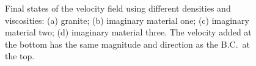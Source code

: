 \documentclass[12pt]{article}
\numberwithin{figure}{section}  %
\numberwithin{equation}{section}  %
\begin{document}
\begin{multicols}{2}
\begin{figure}[!htb]
	\centering
	\caption{Final states of the velocity field using different densities and viscosities: (a) granite; (b) imaginary material one; (c) imaginary material two; (d) imaginary material three. The velocity added at the bottom has the same magnitude and direction as the B.C.\ at the top.}
	\label{fig:vortexone}
\end{figure}


\end{multicols}
\end{document}
